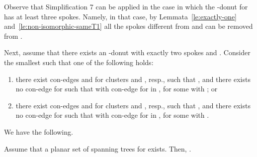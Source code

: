 \documentclass[letter,runningheads]{llncs}
\begin{document}
Observe that Simplification 7 can be applied in the case in which the -donut for  has at least three spokes. Namely, in that case, by Lemmata~\ref{le:exactly-one} and~\ref{le:non-isomorphic-sameT1} all the spokes different from  and  can be removed from .



Next, assume that there exists an -donut with exactly two spokes  and . Consider the smallest  such that one of the following holds:

\begin{enumerate}
\item there exist con-edges  and  for clusters  and , resp., such that , and there exists no con-edge  for  such that  with  con-edge for  in , for some  with ; or
\item there exist con-edges  and  for clusters  and , resp., such that , and there exists no con-edge  for  such that  with  con-edge for  in , for some  with .
\end{enumerate}

We have the following.

\begin{lemma}[{\sc Simplification 8}] \label{le:non-isomorphic-differentTj}
Assume that a planar set  of spanning trees for  exists. Then, .
\end{lemma}
\end{document}
